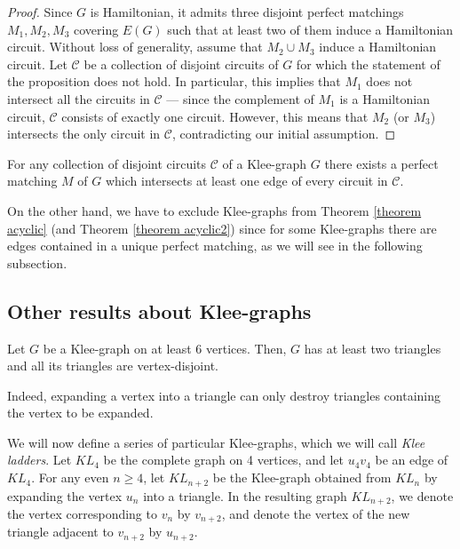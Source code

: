 \documentclass[]{theclass}
\begin{document}
\begin{proof}
Since $G$ is Hamiltonian, it admits three disjoint perfect matchings $M_1,M_2,M_3$ covering $E(G)$ such that at least two of them induce a Hamiltonian circuit. Without loss of generality, assume that $M_2\cup M_3$ induce a Hamiltonian circuit. Let $\mathcal{C}$ be a collection of disjoint circuits of $G$ for which the statement of the proposition does not hold. In particular, this implies that $M_1$ does not intersect all the circuits in $\mathcal{C}$ --- since the complement of $M_1$ is a Hamiltonian circuit, $\mathcal{C}$ consists of exactly one circuit. However, this means that $M_2$ (or $M_3$) intersects the only circuit in $\mathcal{C}$, contradicting our initial assumption.
\end{proof}

\begin{corollary}\label{cor klee collection}
For any collection of disjoint circuits $\mathcal{C}$ of a Klee-graph $G$ there exists a perfect matching $M$ of $G$ which intersects at least one edge of every circuit in $\mathcal{C}$.
\end{corollary}

On the other hand, we have to exclude Klee-graphs from Theorem \ref{theorem acyclic} (and Theorem \ref{theorem acyclic2}) since for some Klee-graphs there are edges contained in a unique perfect matching, as we will see in the following subsection.

\subsection{Other results about Klee-graphs}\label{subsection klee}

\begin{lemma}\label{lemma 2 disjoint triangles klee}
Let $G$ be a Klee-graph on at least 6 vertices. Then, $G$ has at least two triangles and all its triangles are vertex-disjoint.
\end{lemma}

Indeed, expanding a vertex into a triangle can only destroy triangles containing the vertex to be expanded. 

We will now define a series of particular Klee-graphs, which we will call \emph{Klee ladders}. Let $KL_4$ be the complete graph on 4 vertices, and let $u_4v_4$ be an edge of $KL_4$. For any even $n\ge 4$, let $KL_{n+2}$ be the Klee-graph obtained from $KL_n$ by expanding the vertex $u_n$ into a triangle. In the resulting graph $KL_{n+2}$, we denote the vertex corresponding to $v_n$ by $v_{n+2}$, and denote the vertex of the new triangle adjacent to $v_{n+2}$ by $u_{n+2}$.
\end{document}
